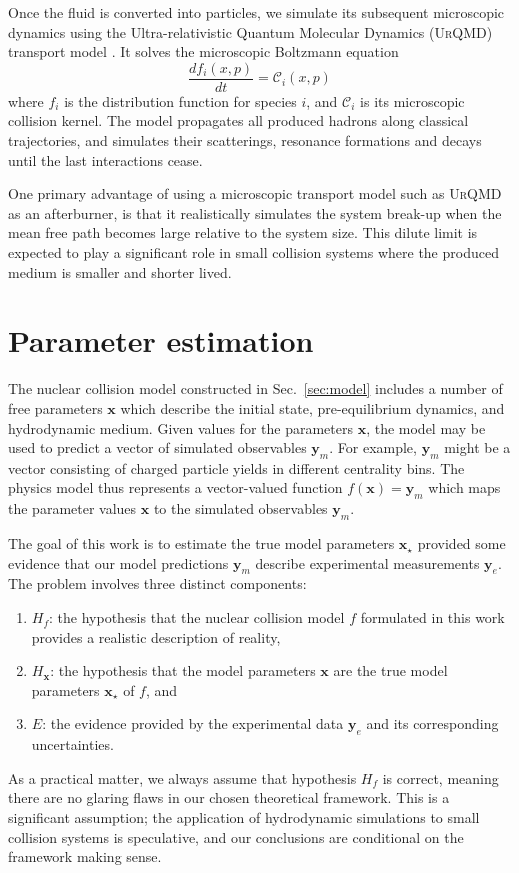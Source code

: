 \documentclass[aps,prc,reprint,amsmath,nofootinbib]{revtex4-1}
\newcommand{\x}{\mathbf{x}}
\newcommand{\y}{\mathbf{y}}
\begin{document}
Once the fluid is converted into particles, we simulate its subsequent microscopic dynamics using the Ultra-relativistic Quantum Molecular Dynamics (\textsc{UrQMD}) transport model \cite{Bass:1998ca, Bleicher:1999xi}.
It solves the microscopic Boltzmann equation
\begin{equation}
  \frac{df_i(x, p)}{dt} = \mathcal{C}_i(x, p)
\end{equation}
where $f_i$ is the distribution function for species $i$, and $\mathcal{C}_i$ is its microscopic collision kernel.
The model propagates all produced hadrons along classical trajectories, and simulates their scatterings, resonance formations and decays until the last interactions cease.

One primary advantage of using a microscopic transport model such as \textsc{UrQMD} as an afterburner, is that it realistically simulates the system break-up when the mean free path becomes large relative to the system size.
This dilute limit is expected to play a significant role in small collision systems where the produced medium is smaller and shorter lived.


\section{Parameter estimation}
\label{sec:calibration}

The nuclear collision model constructed in Sec.~\ref{sec:model} includes a number of free parameters $\x$ which describe the initial state, pre-equilibrium dynamics, and hydrodynamic medium.
Given values for the parameters $\x$, the model may be used to predict a vector of simulated observables $\y_m$.
For example, $\y_m$ might be a vector consisting of charged particle yields in different centrality bins.
The physics model thus represents a vector-valued function $f(\x) = \y_m$ which maps the parameter values $\x$ to the simulated observables $\y_m$.

The goal of this work is to estimate the true model parameters $\x_\star$ provided some evidence that our model predictions $\y_m$ describe experimental measurements $\y_e$.
The problem involves three distinct components:
\begin{enumerate}[itemsep=0pt, leftmargin=2\parindent]
  \item $H_f$: the hypothesis that the nuclear collision model $f$ formulated in this work provides a realistic description of reality,
  \item $H_\x$: the hypothesis that the model parameters $\x$ are the true model parameters $\x_\star$ of $f$, and
  \item $E$: the evidence provided by the experimental data $\y_e$ and its corresponding uncertainties.
\end{enumerate}
As a practical matter, we always assume that hypothesis $H_f$ is correct, meaning there are no glaring flaws in our chosen theoretical framework.
This is a significant assumption; the application of hydrodynamic simulations to small collision systems is speculative, and our conclusions are conditional on the framework making sense.
\end{document}
